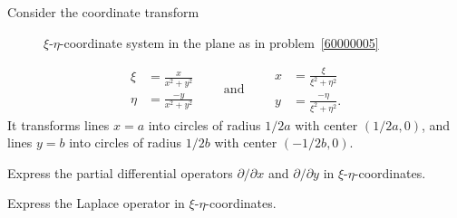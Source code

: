 Consider the coordinate transform
\begin{figure}
\centering
{}
\caption{$\xi$-$\eta$-coordinate system in the plane as in
problem~\ref{60000005}
\label{60000005:domain}}
\end{figure}
\[
\begin{aligned}
\xi  &= \frac{x}{x^2+y^2} \\
\eta &= \frac{-y}{x^2+y^2}
\end{aligned}
\qquad\text{and}\qquad
\begin{aligned}
x &= \frac{\xi}{\xi^2+\eta^2} \\
y &= \frac{-\eta}{\xi^2+\eta^2}.
\end{aligned}
\]
It transforms lines $x=a$ into circles of radius $1/2a$ with center
$(1/2a,0)$,
and lines $y=b$ into circles of radius $1/2b$ with center $(-1/2b,0)$.
\begin{teilaufgaben}
\item Express the partial differential operators $\partial/\partial x$ and
$\partial/\partial y$ in $\xi$-$\eta$-coordinates.
\item Express the Laplace operator in $\xi$-$\eta$-coordinates.
\end{teilaufgaben}

